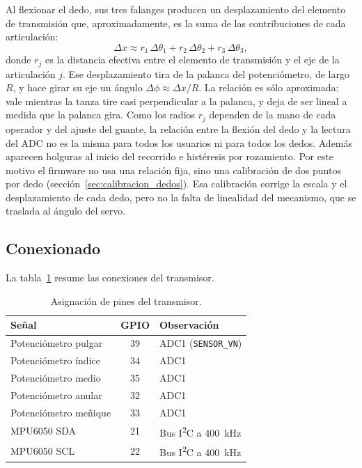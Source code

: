 Al flexionar el dedo, sus tres falanges producen un desplazamiento del elemento de transmisión que, aproximadamente, es la suma de las contribuciones de cada articulación:
\begin{equation}
\Delta x \approx r_1\,\Delta\theta_1 + r_2\,\Delta\theta_2 + r_3\,\Delta\theta_3 ,
\end{equation}
donde $r_j$ es la distancia efectiva entre el elemento de transmisión y el eje de la articulación $j$. Ese desplazamiento tira de la palanca del potenciómetro, de largo $R$, y hace girar su eje un ángulo $\Delta\phi \approx \Delta x / R$. La relación es sólo aproximada: vale mientras la tanza tire casi perpendicular a la palanca, y deja de ser lineal a medida que la palanca gira. Como los radios $r_j$ dependen de la mano de cada operador y del ajuste del guante, la relación entre la flexión del dedo y la lectura del ADC no es la misma para todos los usuarios ni para todos los dedos. Además aparecen holguras al inicio del recorrido e histéresis por rozamiento. Por este motivo el firmware no usa una relación fija, sino una calibración de dos puntos por dedo (sección~\ref{sec:calibracion_dedos}). Esa calibración corrige la escala y el desplazamiento de cada dedo, pero no la falta de linealidad del mecanismo, que se traslada al ángulo del servo.

\subsection{Conexionado}

La tabla~\ref{tab:pines_tx} resume las conexiones del transmisor.

\begin{table}[H]
\centering
\begin{tabular}{l c l}
\toprule
\textbf{Señal} & \textbf{GPIO} & \textbf{Observación} \\
\midrule
Potenciómetro pulgar   & 39 & ADC1 (\texttt{SENSOR\_VN}) \\
Potenciómetro índice   & 34 & ADC1 \\
Potenciómetro medio    & 35 & ADC1 \\
Potenciómetro anular   & 32 & ADC1 \\
Potenciómetro meñique  & 33 & ADC1 \\
MPU6050 SDA            & 21 & Bus I\textsuperscript{2}C a \SI{400}{\kilo\hertz} \\
MPU6050 SCL            & 22 & Bus I\textsuperscript{2}C a \SI{400}{\kilo\hertz} \\
\bottomrule
\end{tabular}
\caption{Asignación de pines del transmisor.}
\label{tab:pines_tx}
\end{table}

